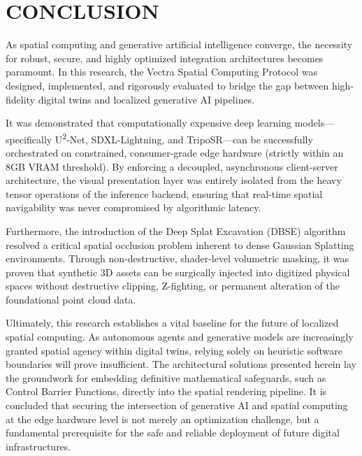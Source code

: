 \section{CONCLUSION}

As spatial computing and generative artificial intelligence converge, the necessity for robust, secure, and highly optimized integration architectures becomes paramount. In this research, the Vectra Spatial Computing Protocol was designed, implemented, and rigorously evaluated to bridge the gap between high-fidelity digital twins and localized generative AI pipelines. 

It was demonstrated that computationally expensive deep learning models—specifically U\textsuperscript{2}-Net, SDXL-Lightning, and TripoSR—can be successfully orchestrated on constrained, consumer-grade edge hardware (strictly within an 8GB VRAM threshold). By enforcing a decoupled, asynchronous client-server architecture, the visual presentation layer was entirely isolated from the heavy tensor operations of the inference backend, ensuring that real-time spatial navigability was never compromised by algorithmic latency. 

Furthermore, the introduction of the Deep Splat Excavation (DBSE) algorithm resolved a critical spatial occlusion problem inherent to dense Gaussian Splatting environments. Through non-destructive, shader-level volumetric masking, it was proven that synthetic 3D assets can be surgically injected into digitized physical spaces without destructive clipping, Z-fighting, or permanent alteration of the foundational point cloud data. 

Ultimately, this research establishes a vital baseline for the future of localized spatial computing. As autonomous agents and generative models are increasingly granted spatial agency within digital twins, relying solely on heuristic software boundaries will prove insufficient. The architectural solutions presented herein lay the groundwork for embedding definitive mathematical safeguards, such as Control Barrier Functions, directly into the spatial rendering pipeline. It is concluded that securing the intersection of generative AI and spatial computing at the edge hardware level is not merely an optimization challenge, but a fundamental prerequisite for the safe and reliable deployment of future digital infrastructures.